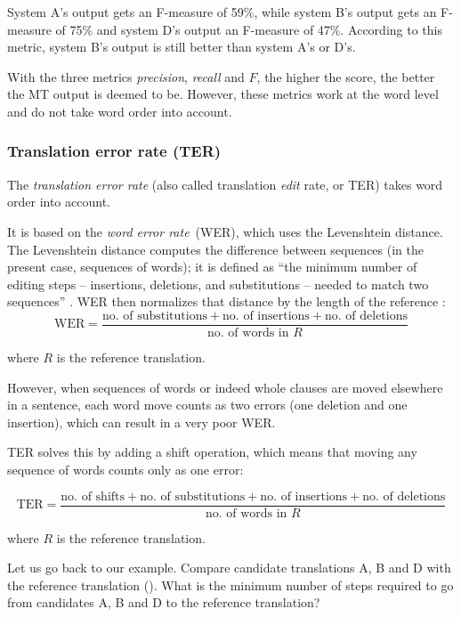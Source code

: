 \documentclass[output=paper]{langscibook}
\begin{document}
System A’s output gets an F-measure of 59\%, while system B’s output gets an F-measure of 75\% and system D’s output an F-measure of 47\%. According to this metric, system B’s output is still better than system A’s or D’s.

With the three metrics \textit{precision}, \textit{recall} and $F$, the higher the score, the better the MT output is deemed to be. However, these metrics work at the word level and do not take word order into account.

\subsubsection{Translation error rate (TER)}\largerpage

The \textit{translation error rate} (also called translation \textit{edit} rate, or TER) takes word order into account.

It is based on the \textit{word error rate}~(WER), which uses the Levenshtein distance. The Levenshtein distance computes the difference between sequences (in the present case, sequences of words); it is defined as “the minimum number of editing steps – insertions, deletions, and substitutions – needed to match two sequences” \citep[224]{Koehn2010}. WER then normalizes that distance by the length of the reference \citep[225]{Koehn2010}:
\begin{equation}
\text{WER}=
\frac{\text{no. of substitutions}+\text{no. of insertions}+\text{no. of deletions}}
{\text{no. of words in } R}
\end{equation}

\noindent where $R$ is the reference translation.

However, when sequences of words or indeed whole clauses are moved elsewhere in a sentence, each word move counts as two errors (one deletion and one insertion), which can result in a very poor WER.

TER solves this by adding a shift operation, which means that moving any sequence of words counts only as one error:

\begin{equation}
\text{TER}=\frac{\text{no. of shifts}+\text{no. of substitutions}+\text{no. of insertions}+\text{no. of deletions}}{\text{no. of words in } R}
\end{equation}

\noindent where $R$ is the reference translation.

Let us go back to our example. Compare candidate translations A, B and D with the reference translation (). What is the minimum number of steps required to go from candidates A, B and D to the reference translation?
\end{document}

